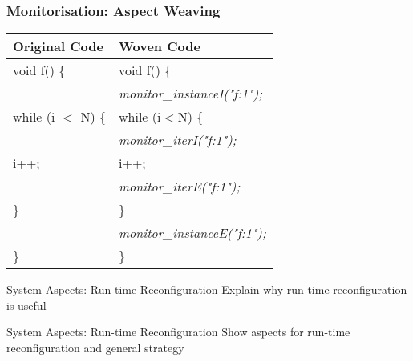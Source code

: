 \begin{frame}
  \frametitle{Monitorisation: Aspect Weaving}
\begin{center}
\renewcommand{\arraystretch}{1.2}
\begin{tabular}{p{5cm}|p{5cm}}
\hline
\bf{Original Code}           & \bf{Woven Code}                                   \\
\hline
void f() \{                  & void f() \{                                       \\
                             & \hspace{3ex}\emph{monitor\_instanceI("f:1");} \\
\hspace{3ex}while (i $ < $ N) \{ & \hspace{3ex}while (i$ < $N) \{                      \\
                             & \hspace{6ex}\emph{monitor\_iterI("f:1");}     \\
\hspace{6ex}i++;             & \hspace{6ex}i++;                                  \\
                             & \hspace{6ex}\emph{monitor\_iterE("f:1");}     \\
\hspace{3ex}\}               & \hspace{3ex}\}                                    \\
                             & \hspace{3ex}\emph{monitor\_instanceE("f:1");} \\
\}                           & \}                                                \\
\end{tabular}
\end{center}
\end{frame}

\begin{frame}{System Aspects: Run-time Reconfiguration}
Explain why run-time reconfiguration is useful
\end{frame}

\begin{frame}{System Aspects: Run-time Reconfiguration}
Show aspects for run-time reconfiguration and general strategy
\end{frame}

